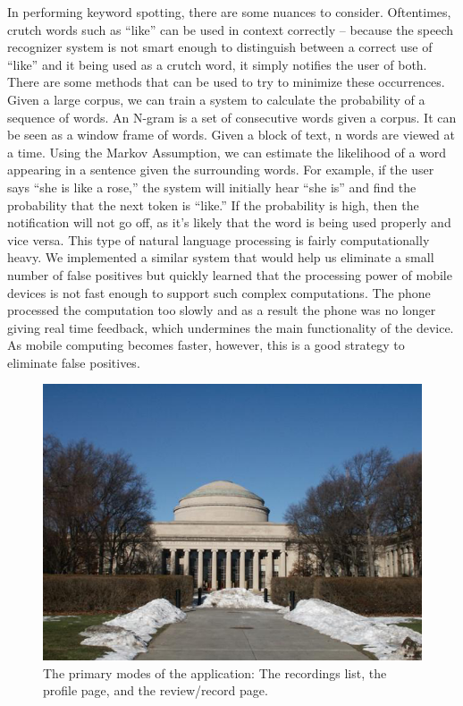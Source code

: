 \documentclass{sigchi}
\begin{document}
In performing keyword spotting, there are some nuances to consider. Oftentimes, crutch words such as “like” can be used in context correctly -- because the speech recognizer system is not smart enough to distinguish between a correct use of “like” and it being used as a crutch word, it simply notifies the user of both. There are some methods that can be used to try to minimize these occurrences. Given a large corpus, we can train a system to calculate the probability of a sequence of words. An N-gram is a set of consecutive words given a corpus. It can be seen as a window frame of words. Given a block of text, n words are viewed at a time. Using the Markov Assumption, we can estimate the likelihood of a word appearing in a sentence given the surrounding words. For example, if the user says “she is like a rose,” the system will initially hear “she is” and find the probability that the next token is “like.” If the probability is high, then the notification will not go off, as it’s likely that the word is being used properly and vice versa. This type of natural language processing is fairly computationally heavy. We implemented a similar system that would help us eliminate a small number of false positives but quickly learned that the processing power of mobile devices is not fast enough to support such complex computations. The phone processed the computation too slowly and as a result the phone was no longer giving real time feedback, which undermines the main functionality of the device. As mobile computing becomes faster, however, this is a good strategy to eliminate false positives.

\begin{figure}[!h]
\centering
\includegraphics[width=0.9\columnwidth]{Figure1}
\caption{The primary modes of the application: The recordings list, the profile page, and the review/record page.
}
\label{fig:figure1}
\end{figure}
\end{document}
